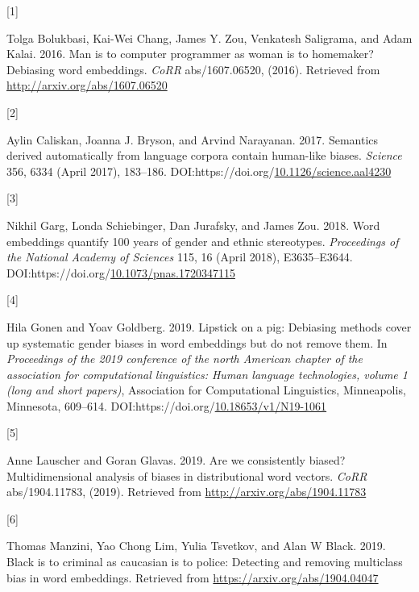 \documentclass[
  10pt,
  dvipsnames,enabledeprecatedfontcommands, twocolumn]{scrartcl}
\newlength{\cslhangindent}
\newlength{\csllabelwidth}
\newlength{\cslentryspacingunit} %
\newenvironment{CSLReferences}[2] %
 {%
  \setlength{\parindent}{0pt}
  \ifodd #1
  \let\oldpar\par
  \def\par{\hangindent=\cslhangindent\oldpar}
  \fi
  \setlength{\parskip}{#2\cslentryspacingunit}
 }%
 {}
\newcommand{\CSLLeftMargin}[1]{\parbox[t]{\csllabelwidth}{#1}}
\newcommand{\CSLRightInline}[1]{\parbox[t]{\linewidth - \csllabelwidth}{#1}\break}
\begin{document}
\hypertarget{refs}{}
\begin{CSLReferences}{0}{0}
\leavevmode{}%
\CSLLeftMargin{{[}1{]} }
\CSLRightInline{Tolga Bolukbasi, Kai-Wei Chang, James Y. Zou, Venkatesh
Saligrama, and Adam Kalai. 2016. Man is to computer programmer as woman
is to homemaker? Debiasing word embeddings. \emph{CoRR} abs/1607.06520,
(2016). Retrieved from \url{http://arxiv.org/abs/1607.06520}}

\leavevmode{}%
\CSLLeftMargin{{[}2{]} }
\CSLRightInline{Aylin Caliskan, Joanna J. Bryson, and Arvind Narayanan.
2017. Semantics derived automatically from language corpora contain
human-like biases. \emph{Science} 356, 6334 (April 2017), 183--186.
DOI:https://doi.org/\href{https://doi.org/10.1126/science.aal4230}{10.1126/science.aal4230}}

\leavevmode{}%
\CSLLeftMargin{{[}3{]} }
\CSLRightInline{Nikhil Garg, Londa Schiebinger, Dan Jurafsky, and James
Zou. 2018. Word embeddings quantify 100 years of gender and ethnic
stereotypes. \emph{Proceedings of the National Academy of Sciences} 115,
16 (April 2018), E3635--E3644.
DOI:https://doi.org/\href{https://doi.org/10.1073/pnas.1720347115}{10.1073/pnas.1720347115}}

\leavevmode{}%
\CSLLeftMargin{{[}4{]} }
\CSLRightInline{Hila Gonen and Yoav Goldberg. 2019. Lipstick on a pig:
{D}ebiasing methods cover up systematic gender biases in word embeddings
but do not remove them. In \emph{Proceedings of the 2019 conference of
the north {A}merican chapter of the association for computational
linguistics: Human language technologies, volume 1 (long and short
papers)}, Association for Computational Linguistics, Minneapolis,
Minnesota, 609--614.
DOI:https://doi.org/\href{https://doi.org/10.18653/v1/N19-1061}{10.18653/v1/N19-1061}}

\leavevmode{}%
\CSLLeftMargin{{[}5{]} }
\CSLRightInline{Anne Lauscher and Goran Glavas. 2019. Are we
consistently biased? Multidimensional analysis of biases in
distributional word vectors. \emph{CoRR} abs/1904.11783, (2019).
Retrieved from \url{http://arxiv.org/abs/1904.11783}}

\leavevmode{}%
\CSLLeftMargin{{[}6{]} }
\CSLRightInline{Thomas Manzini, Yao Chong Lim, Yulia Tsvetkov, and Alan
W Black. 2019. Black is to criminal as caucasian is to police: Detecting
and removing multiclass bias in word embeddings. Retrieved from
\url{https://arxiv.org/abs/1904.04047}}


\end{CSLReferences}
\end{document}
